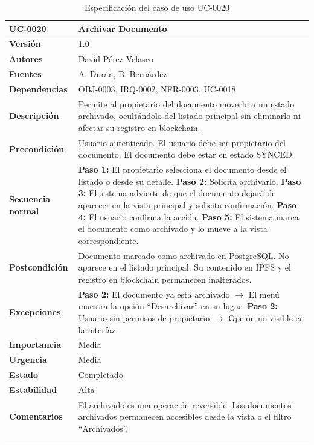 \documentclass[11pt, a4paper]{article}
\begin{document}
\begin{longtable}{|p{4cm}|p{10cm}|}
\hline
\textbf{UC-0020} & Archivar Documento \\
\hline
\textbf{Versión} & 1.0 \\
\hline
\textbf{Autores} & David Pérez Velasco \\
\hline
\textbf{Fuentes} & A. Durán, B. Bernárdez \\
\hline
\textbf{Dependencias} & OBJ-0003, IRQ-0002, NFR-0003, UC-0018 \\
\hline
\textbf{Descripción} & Permite al propietario del documento moverlo a un estado archivado, ocultándolo del listado principal sin eliminarlo ni afectar su registro en blockchain. \\
\hline
\textbf{Precondición} & Usuario autenticado. El usuario debe ser propietario del documento. El documento debe estar en estado SYNCED. \\
\hline
\textbf{Secuencia normal} &
\textbf{Paso 1:} El propietario selecciona el documento desde el listado o desde su detalle.\newline
\textbf{Paso 2:} Solicita archivarlo.\newline
\textbf{Paso 3:} El sistema advierte de que el documento dejará de aparecer en la vista principal y solicita confirmación.\newline
\textbf{Paso 4:} El usuario confirma la acción.\newline
\textbf{Paso 5:} El sistema marca el documento como archivado y lo mueve a la vista correspondiente.\\
\hline
\textbf{Postcondición} & Documento marcado como archivado en PostgreSQL. No aparece en el listado principal. Su contenido en IPFS y el registro en blockchain permanecen inalterados. \\
\hline
\textbf{Excepciones} &
\textbf{Paso 2:} El documento ya está archivado $\rightarrow$ El menú muestra la opción ``Desarchivar'' en su lugar.\newline
\textbf{Paso 2:} Usuario sin permisos de propietario $\rightarrow$ Opción no visible en la interfaz.\\
\hline
\textbf{Importancia} & Media \\
\hline
\textbf{Urgencia} & Media \\
\hline
\textbf{Estado} & Completado \\
\hline
\textbf{Estabilidad} & Alta \\
\hline
\textbf{Comentarios} & El archivado es una operación reversible. Los documentos archivados permanecen accesibles desde la vista o el filtro ``Archivados''. \\
\hline
\caption{Especificación del caso de uso UC-0020}
\end{longtable}
\end{document}
